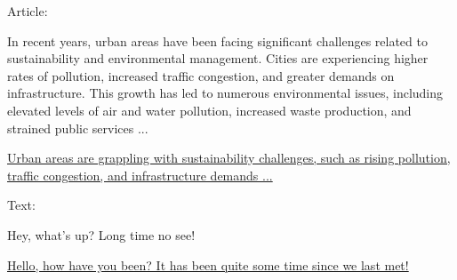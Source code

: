\vspace{0.5em}
\begin{tcolorbox}

\begingroup
\setlength{\leftskip}{2em}
\setlength{\rightskip}{2em}


\vspace{0.7em}

Article:
\vspace{0.3em}

In recent years, urban areas have been facing significant challenges related to sustainability and environmental management. Cities are experiencing higher rates of pollution, increased traffic congestion, and greater demands on infrastructure. This growth has led to numerous environmental issues, including elevated levels of air and water pollution, increased waste production, and strained public services ...

\vspace{0.7em}

\uline{Urban areas are grappling with sustainability challenges, such as rising pollution, traffic congestion, and infrastructure demands ...}

\endgroup

\end{tcolorbox}
\vspace{0.5em}

\vspace{0.5em}
\begin{tcolorbox}

\begingroup
\setlength{\leftskip}{2em}
\setlength{\rightskip}{2em}


\vspace{0.7em}

Text:
\vspace{0.3em}

Hey, what's up? Long time no see!

\vspace{0.7em}

\uline{Hello, how have you been? It has been quite some time since we last met!}

\endgroup

\end{tcolorbox}
\vspace{0.5em}

